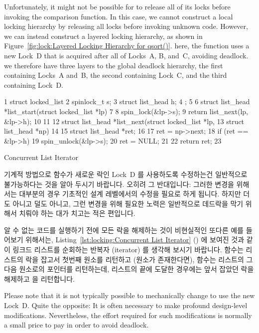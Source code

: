 Unfortunately, it might not be possible for  to release
all of its locks before invoking the comparison function.
In this case, we cannot construct a local locking hierarchy by
releasing all locks before invoking unknown code.
However, we can instead construct a layered locking hierarchy, as shown in
Figure~\ref{fig:lock:Layered Locking Hierarchy for qsort()}.
here, the  function uses a new Lock~D that is acquired after
all of Locks~A, B, and~C, avoiding deadlock.
we therefore have three layers to the global deadlock hierarchy, the
first containing Locks~A and~B, the second containing Lock~C, and
the third containing Lock~D.
\fi

\begin{listing}[tbp]
{ \scriptsize
\begin{verbbox}
  1 struct locked_list {
  2   spinlock_t s;
  3   struct list_head h;
  4 };
  5 
  6 struct list_head *list_start(struct locked_list *lp)
  7 {
  8   spin_lock(&lp->s);
  9   return list_next(lp, &lp->h);
 10 }
 11 
 12 struct list_head *list_next(struct locked_list *lp,
 13                             struct list_head *np)
 14 {
 15   struct list_head *ret;
 16 
 17   ret = np->next;
 18   if (ret == &lp->h) {
 19     spin_unlock(&lp->s);
 20     ret = NULL;
 21   }
 22   return ret;
 23 }
\end{verbbox}
}
\centering
\theverbbox
\caption{Concurrent List Iterator}
\label{lst:locking:Concurrent List Iterator}
\end{listing}

기계적 방법으로  함수가 새로운 락인 Lock~D 를 사용하도록 수정하는건
일반적으로 불가능하다는 것을 알아 두시기 바랍니다.
오히려 그 반대입니다: 그러한 변경을 위해서는 대부분의 경우 기초적인 설계
레벨에서의 수정을 필요로 하게 됩니다.
하지만 더도 아니고 덜도 아니고, 그런 변경을 위해 필요한 노력은 일반적으로
데드락을 막기 위해서 치뤄야 하는 대가 치고는 적은 편입니다.

알 수 없는 코드를 실행하기 전에 모든 락을 해제하는 것이 비현실적인 또다른 예를
들어보기 위해서는,
Listing~\ref{lst:locking:Concurrent List Iterator} () 에
보여진 것과 같이 링크드 리스트를 순회하는 반복자 (iterator) 를 생각해 보시기
바랍니다.
 함수는 리스트의 락을 잡고서 첫번째 원소를 리턴하고 (원소가
존재한다면),  함수는 리스트의 그 다음 원소로의 포인터를
리턴하는데, 리스트의 끝에 도달한 경우에는 앞서 잡았던 락을 해제하고 
을 리턴합니다.
\iffalse

Please note that it is not typically possible to mechanically
change  to use the new Lock~D.
Quite the opposite: It is often necessary to make profound design-level
modifications.
Nevertheless, the effort required for such modifications is normally
a small price to pay in order to avoid deadlock.

